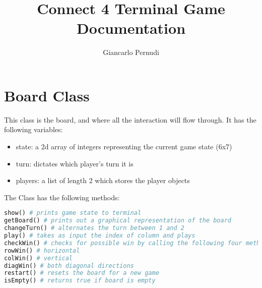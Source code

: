 \documentclass[12pt]{article}
\title{Connect 4 Terminal Game Documentation}
\author{Giancarlo Pernudi}
\begin{document}
\maketitle





\section{Board Class}

This class is the board, and where all the interaction will flow through. It has the following variables:
\begin{itemize}
  \item state: a 2d array of integers representing the current game state (6x7)
  \item turn: dictates which player's turn it is
  \item players: a list of length 2 which stores the player objects
\end{itemize}


The Class has the following methods:
\begin{lstlisting}[language=Python]
show() # prints game state to terminal
getBoard() # prints out a graphical representation of the board
changeTurn() # alternates the turn between 1 and 2
play() # takes as input the index of column and plays
checkWin() # checks for possible win by calling the following four methods:
rowWin() # horizontal
colWin() # vertical
diagWin() # both diagonal directions
restart() # resets the board for a new game
isEmpty() # returns true if board is empty
\end{lstlisting}
\end{document}
